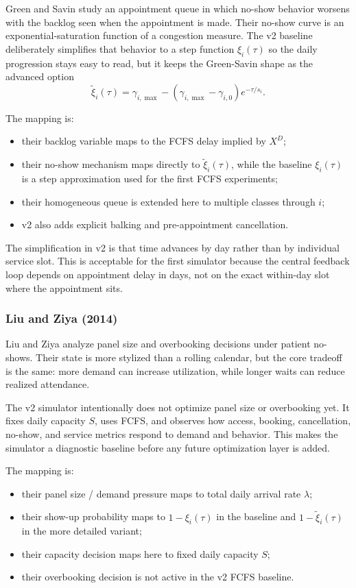 \documentclass[11pt]{article}
\begin{document}
Green and Savin study an appointment queue in which no-show behavior worsens with the backlog seen
when the appointment is made. Their no-show curve is an exponential-saturation function of a
congestion measure. The v2 baseline deliberately simplifies that behavior to a step function
\(\xi_i(\tau)\) so the daily progression stays easy to read, but it keeps the Green-Savin shape as
the advanced option
\[
\tilde{\xi}_i(\tau)
=
\gamma_{i,\max}
-
(\gamma_{i,\max}-\gamma_{i,0})e^{-\tau/s_i}.
\]

The mapping is:
\begin{itemize}[nosep]
    \item their backlog variable maps to the FCFS delay implied by \(X^D\);
    \item their no-show mechanism maps directly to \(\tilde{\xi}_i(\tau)\), while the baseline \(\xi_i(\tau)\) is a step approximation used for the first FCFS experiments;
    \item their homogeneous queue is extended here to multiple classes through \(i\);
    \item v2 also adds explicit balking and pre-appointment cancellation.
\end{itemize}

The simplification in v2 is that time advances by day rather than by individual service slot. This
is acceptable for the first simulator because the central feedback loop depends on appointment
delay in days, not on the exact within-day slot where the appointment sits.

\subsubsection{Liu and Ziya (2014)}

Liu and Ziya analyze panel size and overbooking decisions under patient no-shows. Their state is
more stylized than a rolling calendar, but the core tradeoff is the same: more demand can increase
utilization, while longer waits can reduce realized attendance.

The v2 simulator intentionally does not optimize panel size or overbooking yet. It fixes daily
capacity \(S\), uses FCFS, and observes how access, booking, cancellation, no-show, and service
metrics respond to demand and behavior. This makes the simulator a diagnostic baseline before any
future optimization layer is added.

The mapping is:
\begin{itemize}[nosep]
    \item their panel size / demand pressure maps to total daily arrival rate \(\lambda\);
    \item their show-up probability maps to \(1-\xi_i(\tau)\) in the baseline and \(1-\tilde{\xi}_i(\tau)\) in the more detailed variant;
    \item their capacity decision maps here to fixed daily capacity \(S\);
    \item their overbooking decision is not active in the v2 FCFS baseline.
\end{itemize}
\end{document}
